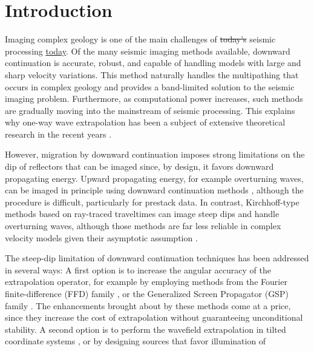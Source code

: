 \section{Introduction}


Imaging complex geology is one of the main challenges of 
\sout{today's}
seismic processing
\uline{today}. 
Of the many seismic imaging methods available,
downward continuation \cite[]{Claerbout.blackwell.85}
is accurate, robust, and capable of handling
models with large and sharp velocity variations.
This method naturally handles the multipathing
that occurs in complex geology and provides a band-limited
solution to the seismic imaging problem.
Furthermore, as computational power increases, such methods
are gradually moving into the mainstream of seismic
processing.
This explains why one-way wave extrapolation has been a 
subject of extensive theoretical research in the recent years
\cite[]{ristow.geo.94,dehoop.jmathphys.96,SEG-1996-0415,thomson1999,GEO67-03-08720882}.
\par
However, migration by downward 
continuation imposes strong limitations on the dip of reflectors 
that can be imaged since, by design, it favors 
downward propagating energy.
Upward propagating energy, for example overturning waves,
can be imaged in principle using downward continuation
methods \cite[]{GEO57-11-14531462}, although the procedure 
is difficult, particularly for prestack data.
In contrast, Kirchhoff-type methods based on ray-traced
traveltimes can image steep dips and handle 
overturning waves, although those methods are far less 
reliable in complex velocity models given their
asymptotic assumption \cite[]{GEO66-05-16221640}.
\par
The steep-dip limitation of downward continuation techniques has
been addressed in several ways: 
\bit
\itt A first option is to increase the
angular accuracy of the extrapolation operator, for example by 
employing methods from the Fourier finite-difference (FFD)
family \cite[]{ristow.geo.94,GEO67-03-08720882}, or the
Generalized Screen Propagator (GSP) family 
\cite[]{dehoop.jmathphys.96,SEG-1996-0415}. 
The enhancements brought about by these methods
come at a price, since they increase the cost of 
extrapolation without guaranteeing unconditional stability.
\itt A second option is to perform the wavefield extrapolation
in tilted coordinate systems \cite[]{Etgen-SEG02}, 
or by designing sources that favor illumination of
